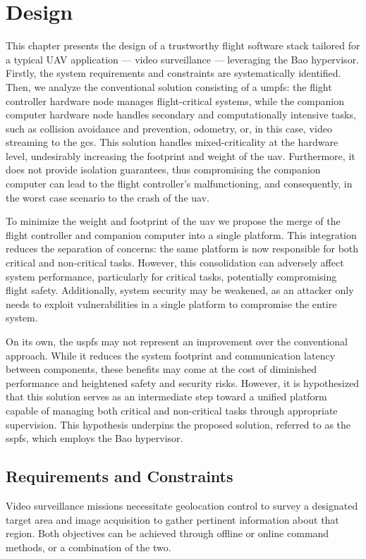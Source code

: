 %
\chapter{Design}%
\label{ch:design}
%
This chapter presents the design of a trustworthy flight software stack tailored
for a typical UAV application --- video surveillance --- leveraging the Bao
hypervisor. Firstly, the system requirements and constraints are systematically
identified. Then, we analyze the conventional solution consisting of a
\gls{umpfs}: the flight controller hardware node manages flight-critical
systems, while the companion computer hardware node handles secondary and
computationally intensive tasks, such as collision avoidance and prevention,
odometry, or, in this case, video streaming to the \gls{gcs}. This solution
handles mixed-criticality at the hardware level, undesirably increasing the
footprint and weight of the \gls{uav}. Furthermore, it does not provide
isolation guarantees, thus compromising the companion computer can lead to the
flight controller's malfunctioning, and consequently, in the worst case scenario
to the crash of the \gls{uav}.

To minimize the weight and footprint of the \gls{uav} we propose the merge of
the flight controller and companion computer into a single platform. This
integration reduces the separation of concerns: the same platform is now
responsible for both critical and non-critical tasks. However, this
consolidation can adversely affect system performance, particularly for critical
tasks, potentially compromising flight safety. Additionally, system security may
be weakened, as an attacker only needs to exploit vulnerabilities in a single
platform to compromise the entire system.

On its own, the \gls{uspfs} may not represent an improvement over the
conventional approach. While it reduces the system footprint and communication
latency between components, these benefits may come at the cost of diminished
performance and heightened safety and security risks. However, it is
hypothesized that this solution serves as an intermediate step toward a unified
platform capable of managing both critical and non-critical tasks through
appropriate supervision. This hypothesis underpins the proposed solution,
referred to as the \gls{sspfs}, which employs the Bao hypervisor.

\section{Requirements and Constraints}
\label{sec:req-sec}
Video surveillance missions necessitate geolocation control to survey a
designated target area and image acquisition to gather pertinent information
about that region. Both objectives can be achieved through offline or online
command methods, or a combination of the two.

